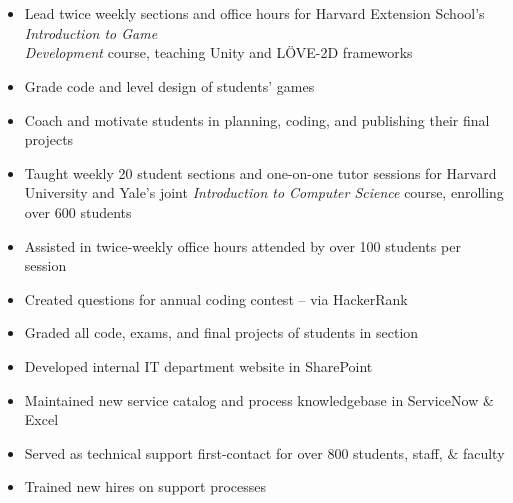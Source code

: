 \documentclass[hidelinks, 11pt]{article}
\begin{document}
\section*{}
\begin{addmargin}{.5in}

    \begin{itemize}\setlength\itemsep{-4pt}
      \item{Lead twice weekly sections and office hours for Harvard Extension School's \emph{Introduction to Game\\ Development} course, teaching Unity and LÖVE-2D frameworks}
      \item{Grade code and level design of students' games}
      \item{Coach and motivate students in planning, coding, and publishing their final projects}
    \end{itemize}
    \begin{itemize}\setlength\itemsep{-4pt}
      \item{Taught weekly 20 student sections and one-on-one tutor sessions for Harvard University and Yale's joint \emph{Introduction to Computer Science} course, enrolling over 600 students}
      \item{Assisted in twice-weekly office hours attended by over 100 students per session}
      \item{Created questions for annual coding contest – via HackerRank}
      \item{Graded all code, exams, and final projects of students in section}
    \end{itemize}
    \begin{itemize}\setlength\itemsep{-4pt}
        \item{Developed internal IT department website in SharePoint}
          \item{Maintained new service catalog and process knowledgebase in ServiceNow $\&$ Excel}
          \item{Served as technical support first-contact for over 800 students, staff, $\&$ faculty}
          \item{Trained new hires on support processes}
      \end{itemize}
\end{addmargin}
\vspace{-6pt}

\end{document}
